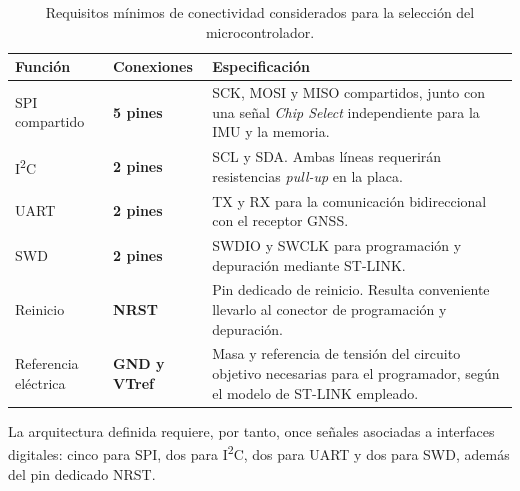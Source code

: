\documentclass[11pt,a4paper]{article}
\begin{document}
\begin{table}[H]

    \centering
    \renewcommand{\arraystretch}{1.3}

    \begin{tabularx}{\textwidth}{
        >{\raggedright\arraybackslash}p{3.2cm}
        >{\centering\arraybackslash}p{2.7cm}
        >{\raggedright\arraybackslash}X
    }

        \toprule
        \textbf{Función} &
        \textbf{Conexiones} &
        \textbf{Especificación} \\
        \midrule

        SPI compartido &
        \textbf{5 pines} &
        SCK, MOSI y MISO compartidos, junto con una señal
        \textit{Chip Select} independiente para la IMU y la memoria. \\

        I\textsuperscript{2}C &
        \textbf{2 pines} &
        SCL y SDA\@. Ambas líneas requerirán resistencias
        \textit{pull-up} en la placa. \\

        UART &
        \textbf{2 pines} &
        TX y RX para la comunicación bidireccional con el receptor GNSS\@. \\

        SWD &
        \textbf{2 pines} &
        SWDIO y SWCLK para programación y depuración mediante ST-LINK\@. \\

        Reinicio &
        \textbf{NRST} &
        Pin dedicado de reinicio. Resulta conveniente llevarlo al
        conector de programación y depuración. \\

        Referencia eléctrica &
        \textbf{GND y VTref} &
        Masa y referencia de tensión del circuito objetivo necesarias
        para el programador, según el modelo de ST-LINK empleado. \\

        \bottomrule

    \end{tabularx}

    \caption{Requisitos mínimos de conectividad considerados para la selección del microcontrolador.}

\end{table}

La arquitectura definida requiere, por tanto, once señales asociadas a
interfaces digitales: cinco para SPI, dos para I\textsuperscript{2}C,
dos para UART y dos para SWD, además del pin dedicado NRST\@.
\end{document}
